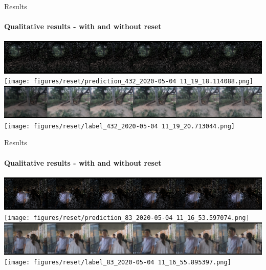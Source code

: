 \documentclass[
	ngerman,
	aspectratio=169,
	color={accentcolor=3d},
	logo=false,
	colorframetitle=true,
	]{tudabeamer}
\begin{document}
\begin{frame}{Results}
    \framesubtitle{Qualitative results - with and without reset}
    \begin{center}
    \includegraphics[width=0.75\linewidth]{figures/reset/input_432_2020-05-04 11_19_22.304534.png}
    \texttt{[image: figures/reset/prediction\_432\_2020-05-04 11\_19\_18.114088.png]}
    \includegraphics[width=0.75\linewidth]{figures/no_rest/prediction_432_2020-05-06 09_58_40.811600.png}
    \texttt{[image: figures/reset/label\_432\_2020-05-04 11\_19\_20.713044.png]}
    \end{center}
\end{frame}

\begin{frame}{Results}
    \framesubtitle{Qualitative results - with and without reset}
    \begin{center}
    \includegraphics[width=0.75\linewidth]{figures/reset/input_83_2020-05-04 11_16_57.840082.png}
    \texttt{[image: figures/reset/prediction\_83\_2020-05-04 11\_16\_53.597074.png]}
    \includegraphics[width=0.75\linewidth]{figures/no_rest/prediction_83_2020-05-06 09_56_17.234900.png}
    \texttt{[image: figures/reset/label\_83\_2020-05-04 11\_16\_55.895397.png]}
    \end{center}
\end{frame}
\end{document}
